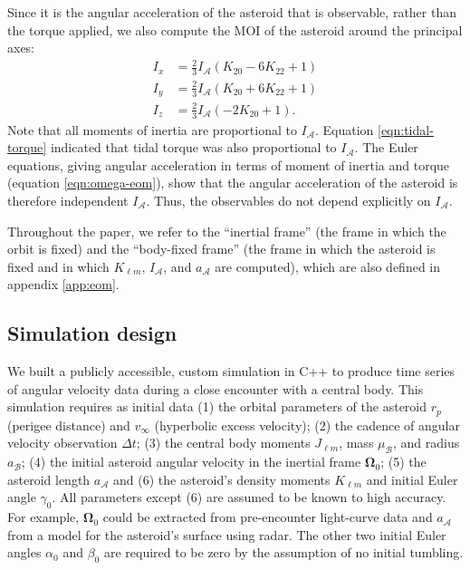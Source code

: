 \documentclass[fleqn,usenatbib]{mnras}
\newcommand{\parens}[1]{\left( #1 \right)}
\begin{document}
Since it is the angular acceleration of the asteroid that is observable, rather than the torque applied, we also compute the MOI of the asteroid around the principal axes: 
\begin{equation}
  \begin{split}
    I_x &= \frac{2}{3} I_\mathcal{A} \parens{K_{20} - 6 K_{22} + 1}\\
    I_y &= \frac{2}{3} I_\mathcal{A} \parens{K_{20} + 6 K_{22} + 1}\\
    I_z &= \frac{2}{3} I_\mathcal{A} \parens{-2K_{20} + 1}.
  \end{split}
  \label{eqn:moi}
\end{equation}
Note that all moments of inertia are proportional to $I_\mathcal{A}$. Equation \ref{eqn:tidal-torque} indicated that tidal torque was also proportional to $I_\mathcal{A}$. The Euler equations, giving angular acceleration in terms of moment of inertia and torque (equation \ref{eqn:omega-eom}), show that the angular acceleration of the asteroid is therefore independent $I_\mathcal{A}$. Thus, the observables do not depend explicitly on $I_\mathcal{A}$.

Throughout the paper, we refer to the ``inertial frame'' (the frame in which the orbit is fixed) and the ``body-fixed frame'' (the frame in which the asteroid is fixed and in which $K_{\ell m}$, $I_\mathcal{A}$, and $a_\mathcal{A}$ are computed), which are also defined in appendix \ref{app:eom}.

\subsection{Simulation design}
\label{sec:sim}

We built a publicly accessible, custom simulation in C++ to produce time series of angular velocity data during a close encounter with a central body. This simulation requires as initial data (1) the orbital parameters of the asteroid $r_p$ (perigee distance) and $v_\infty$ (hyperbolic excess velocity); (2) the cadence of angular velocity observation $\Delta t$; (3) the central body moments $J_{\ell m}$, mass $\mu_\mathcal{B}$, and radius $a_\mathcal{B}$; (4) the initial asteroid angular velocity in the inertial frame $\bm \Omega_0$; (5) the asteroid length $a_\mathcal{A}$ and (6) the asteroid's density moments $K_{\ell m}$ and initial Euler angle $\gamma_0$. All parameters except (6) are assumed to be known to high accuracy. For example, $\bm \Omega_0$ could be extracted from pre-encounter light-curve data and $a_\mathcal{A}$ from a model for the asteroid's surface using radar. The other two initial Euler angles $\alpha_0$ and $\beta_0$ are required to be zero by the assumption of no initial tumbling.
\end{document}
